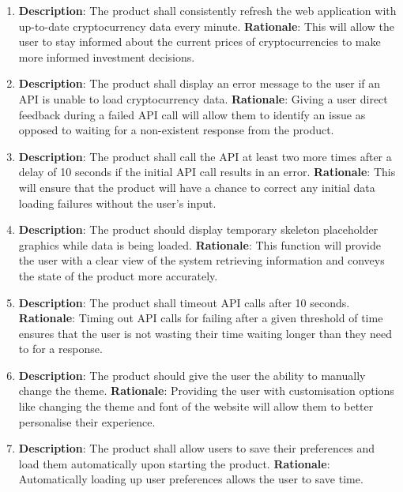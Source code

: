 \documentclass[12pt, titlepage]{article}
\begin{document}
\begin{enumerate}[label = FR-\arabic*, left=\parindent, series=fr]
    \item \textbf{Description}: The product shall consistently refresh the web application with up-to-date cryptocurrency data every minute.
    \newline \textbf{Rationale}: This will allow the user to stay informed about the current prices of cryptocurrencies to make more informed investment decisions.
    
    \item \textbf{Description}: The product shall display an error message to the user if an API is unable to load cryptocurrency data.
    \newline \textbf{Rationale}: Giving a user direct feedback during a failed API call will allow them to identify an issue as opposed to waiting for a non-existent response from the product. 
    
    \item \textbf{Description}: The product shall call the API at least two more times after a delay of 10 seconds if the initial API call results in an error.
    \newline \textbf{Rationale}: This will ensure that the product will have a chance to correct any initial data loading failures without the user's input.
    
    \item \textbf{Description}: The product should display temporary skeleton placeholder graphics while data is being loaded. 
    \newline \textbf{Rationale}: This function will provide the user with a clear view of the system retrieving information and conveys the state of the product more accurately. 
    
    \item \textbf{Description}: The product shall timeout API calls after 10 seconds.
    \newline \textbf{Rationale}: Timing out API calls for failing after a given threshold of time ensures that the user is not wasting their time waiting longer than they need to for a response.
    
    \item \textbf{Description}: The product should give the user the ability to manually change the theme.
    \newline \textbf{Rationale}: Providing the user with customisation options like changing the theme and font of the website will allow them to better personalise their experience. 
    
    \item \textbf{Description}: The product shall allow users to save their preferences and load them automatically upon starting the product.
    \newline \textbf{Rationale}: Automatically loading up user preferences allows the user to save time.
    
\end{enumerate}
\end{document}

